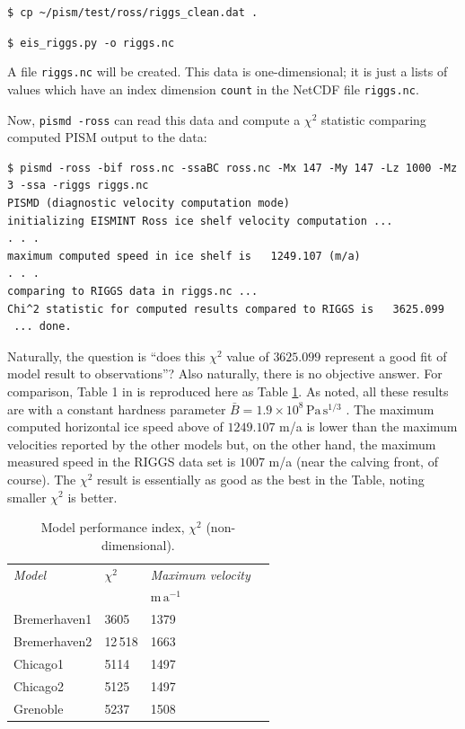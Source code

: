 \documentclass[11pt,final]{amsart}
\begin{document}
\verb|$ cp ~/pism/test/ross/riggs_clean.dat .|

\verb|$ eis_riggs.py -o riggs.nc|

\noindent A file \verb|riggs.nc| will be created.  This data is one-dimensional; it is just a lists of values which have an index dimension \verb|count| in the NetCDF file \verb|riggs.nc|.

Now, \verb|pismd -ross| can read this data and compute a $\chi^2$ statistic comparing computed PISM output to the data:

\small\begin{verbatim}
$ pismd -ross -bif ross.nc -ssaBC ross.nc -Mx 147 -My 147 -Lz 1000 -Mz 3 -ssa -riggs riggs.nc
PISMD (diagnostic velocity computation mode)
initializing EISMINT Ross ice shelf velocity computation ...
. . .
maximum computed speed in ice shelf is   1249.107 (m/a)
. . .
comparing to RIGGS data in riggs.nc ...
Chi^2 statistic for computed results compared to RIGGS is   3625.099
 ... done.
\end{verbatim}
\normalsize

Naturally, the question is ``does this $\chi^2$ value of $3625.099$ represent a good fit of model result to observations''?  Also naturally, there is no objective answer.  For comparison, Table 1 in \cite{MacAyealetal} is reproduced here as Table \ref{tab:chisqr}.  As noted, all these results are with a constant hardness parameter $\bar B = 1.9 \times 10^8 \, \text{Pa}\, \text{s}^{1/3}$ \cite{MacAyealetal}.  The maximum computed horizontal ice speed above of $1249.107$ m/a is lower than the maximum velocities reported by the other models but, on the other hand, the maximum measured speed in the RIGGS data set is $1007$ m/a (near the calving front, of course).  The $\chi^2$ result is essentially as good as the best in the Table, noting smaller $\chi^2$ is better.

\small
\begin{table}[ht]
\caption{Model performance index, $\chi^2$ (non-dimensional).  }\label{tab:chisqr}
\begin{tabular}{@{}llll}\hline
\textsl{Model} & $\chi^2$ & \textsl{Maximum velocity} \\
 & & $\text{m}\,\text{a}^{-1}$ \\ \hline
Bremerhaven1 & 3605 & 1379 \\
Bremerhaven2 & 12\,518 & 1663 \\
Chicago1 & 5114 & 1497 \\
Chicago2 & 5125 & 1497 \\
Grenoble & 5237 & 1508 \\
\hline
\end{tabular}
\end{table}
\normalsize
\end{document}

